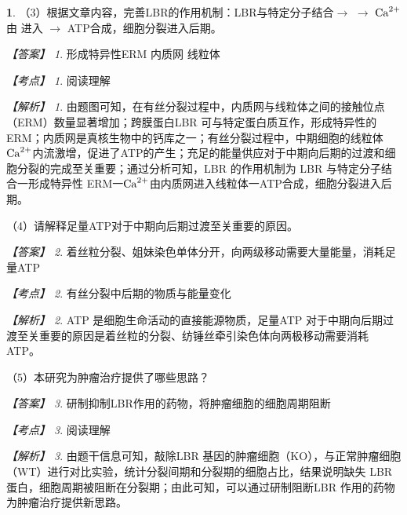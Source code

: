 \documentclass[UTF8, 10pt, a4paper, oneside]{ctexart}
\newcommand{\blank}{ \underbar{\quad$\blacktriangle$\quad} }%
\theoremstyle{definition}
\newtheorem{exercise}{}
\theoremstyle{remark}
\newtheorem*{answer}{【答案】}
\newtheorem*{point}{【考点】}      %
\newtheorem*{explanation}{【解析】}     %
\theoremstyle{plain}
\begin{document}
\begin{exercise}
    （3）根据文章内容，完善LBR的作用机制：LBR与特定分子结合$\rightarrow$ \blank $\rightarrow$ $\ce{Ca^2+}$ 由 \blank 进入\blank $\rightarrow$ ATP合成，细胞分裂进入后期。

    \begin{answer}
        形成特异性ERM \qquad 内质网 \qquad 线粒体
    \end{answer}
    \begin{point}
        阅读理解
    \end{point}
    \begin{explanation}
        由题图可知，在有丝分裂过程中，内质网与线粒体之间的接触位点（ERM）数量显著增加；跨膜蛋白LBR 可与特定蛋白质互作，形成特异性的 ERM；内质网是真核生物中的钙库之一；有丝分裂过程中，中期细胞的线粒体 $\ce{Ca^2+}$内流激增，促进了ATP的产生；充足的能量供应对于中期向后期的过渡和细胞分裂的完成至关重要；通过分析可知，LBR 的作用机制为 LBR 与特定分子结合一形成特异性 ERM一$\ce{Ca^2+}$由内质网进入线粒体一ATP合成，细胞分裂进入后期。
    \end{explanation}

    （4）请解释足量ATP对于中期向后期过渡至关重要的原因。

    \begin{answer}
        着丝粒分裂、姐妹染色单体分开，向两级移动需要大量能量，消耗足量ATP
    \end{answer}
    \begin{point}
        有丝分裂中后期的物质与能量变化
    \end{point}
    \begin{explanation}
        ATP 是细胞生命活动的直接能源物质，足量ATP 对于中期向后期过渡至关重要的原因是着丝粒的分裂、纺锤丝牵引染色体向两极移动需要消耗 ATP。
    \end{explanation}

    （5）本研究为肿瘤治疗提供了哪些思路？

    \begin{answer}
        研制抑制LBR作用的药物，将肿瘤细胞的细胞周期阻断
    \end{answer}
    \begin{point}
        阅读理解
    \end{point}
    \begin{explanation}
        由题干信息可知，敲除LBR 基因的肿瘤细胞（KO），与正常肿瘤细胞（WT）进行对比实验，统计分裂间期和分裂期的细胞占比，结果说明缺失 LBR 蛋白，细胞周期被阻断在分裂期；由此可知，可以通过研制阻断LBR 作用的药物为肿瘤治疗提供新思路。
    \end{explanation}
\end{exercise}
\end{document}
